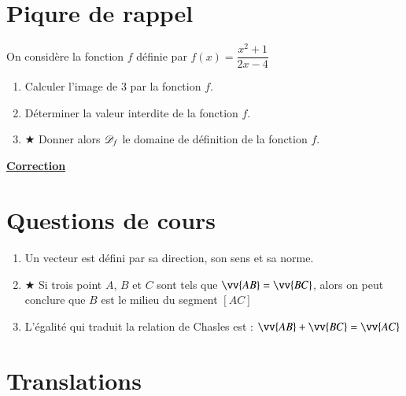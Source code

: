 \documentclass[oneside,12pt]{exam}          %
\begin{document}
\section{Piqure de rappel}
On considère la fonction $f$ définie par $f(x) = \dfrac{x^2 + 1}{2x - 4}$
\begin{enumerate}[itemsep = 2mm]
	\item Calculer l'image de $3$ par la fonction $f$. \dotfill
	\item Déterminer la valeur interdite de la fonction $f$. \dotfill
	\item $\bigstar$ Donner alors ${\mathscr{D}}_f$ le domaine de définition de la fonction $f$. \dotfill
\end{enumerate}



\newpage
\setcounter{section}{0}
\color{newblue}


\begin{center}
	\textbf{\underline{Correction}}
\end{center}

\section{Questions de cours}
\begin{enumerate}
	\item Un vecteur est défini par sa direction, son sens et sa norme.
	
	\item $\bigstar$ Si trois point $A$, $B$ et $C$ sont tels que $\vv{AB} = \vv{BC}$, alors on peut conclure que $B$ est le milieu du segment $[AC]$
	
	\item L'égalité qui traduit la relation de Chasles est : $\vv{AB} + \vv{BC} = \vv{AC}$
\end{enumerate}



\section{Translations}
\end{document}
